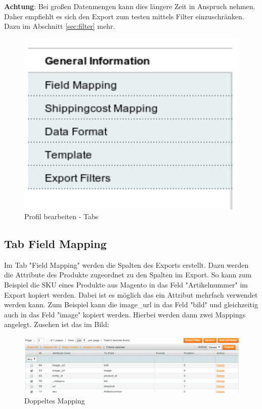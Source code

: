 \documentclass[a4paper,12pt]{book}
\begin{document}
\textbf{Achtung}: Bei großen Datenmengen kann dies längere Zeit in Anspruch
nehmen. Daher empfiehlt es sich den Export zum testen mittels Filter
einzuschränken. Dazu im Abschnitt \ref{sec:filter} mehr.

\begin{figure}
 \includegraphics[width=1\textwidth]{img/bild04.png}
  \caption{Profil bearbeiten - Tabs}
  \label{figure:new_profile_tabs}
\end{figure}

\subsection{Tab Field Mapping}
\label{sec:field_mapping}

Im Tab "Field Mapping" werden die Spalten des Exports erstellt. Dazu
werden die Attribute des Produkte zugeordnet zu den Spalten im Export.
So kann zum Beispiel die SKU eines Produkte aus Magento in das Feld
"Artikelnummer" im Export kopiert werden. Dabei ist es möglich das ein
Attribut mehrfach verwendet werden kann. Zum Beispiel kann die
image\_url in das Feld "bild" und gleichzeitig auch in das Feld
"image" kopiert werden. Hierbei werden dann zwei Mappings
angelegt. Zusehen ist das im Bild:

\begin{figure}
 \includegraphics[width=1\textwidth]{img/bild07.png}
  \caption{Doppeltes Mapping}
  \label{figure:double_mapping}
\end{figure}
\end{document}
